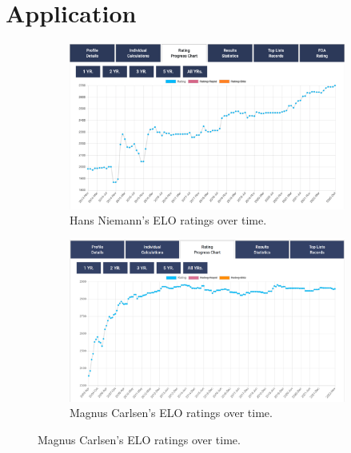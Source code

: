 \documentclass[12pt, letterpaper, titlepage]{article}
\begin{document}
\section*{Application}
\label{sec:app}

\begin{figure}
    \begin{subfigure}{.5\textwidth}
    \includegraphics[scale=0.2]{niemann_rating.png}
    \caption{Hans Niemann's ELO ratings over time. \citep{hansniemannrating}}
    \label{fig:sfig1}
    \end{subfigure}

    \begin{subfigure}{.5\textwidth}
    \includegraphics[scale=0.45]{carlsen_rating.png}
    \caption{Magnus Carlsen's ELO ratings over time. \citep{hansniemannrating}}
    \label{fig:sfig2}
    \end{subfigure}
\label{fig:fig}
\end{figure}
\end{document}
